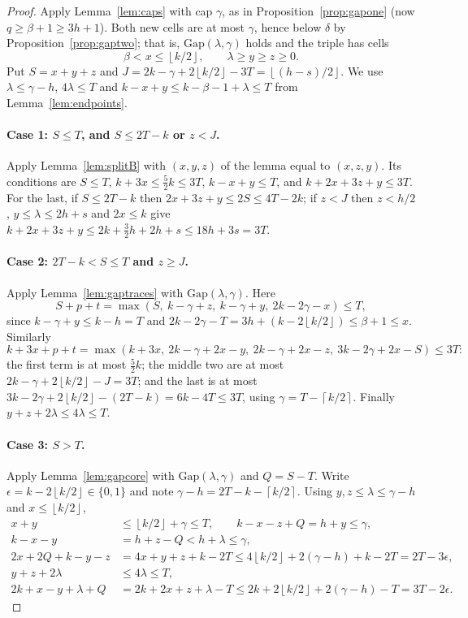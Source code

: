 \documentclass[11pt]{article}
\numberwithin{equation}{section}
\theoremstyle{definition}
\theoremstyle{remark}
\newcommand{\ceil}[1]{\left\lceil #1\right\rceil}
\newcommand{\floor}[1]{\left\lfloor #1\right\rfloor}
\newcommand{\Gap}{\mathrm{Gap}}
\begin{document}
\begin{proof}
Apply Lemma~\ref{lem:caps} with cap $\gamma$, as in
Proposition~\ref{prop:gapone} (now $q\ge\beta+1\ge3h+1$). Both new cells
are at most $\gamma$, hence below $\delta$ by
Proposition~\ref{prop:gaptwo}; that is, $\Gap(\lambda,\gamma)$ holds and
the triple has cells
\[
 \beta<x\le\floor{k/2},\qquad \lambda\ge y\ge z\ge0 .
\]
Put $S=x+y+z$ and $J=2k-\gamma+2\floor{k/2}-3T=\floor{(h-s)/2}$. We use
$\lambda\le\gamma-h$, $4\lambda\le T$ and $k-x+y\le k-\beta-1+\lambda\le T$
from Lemma~\ref{lem:endpoints}.

\paragraph{Case 1: $S\le T$, and $S\le2T-k$ or $z<J$.}
Apply Lemma~\ref{lem:splitB} with $(x,y,z)$ of the lemma equal to
$(x,z,y)$. Its conditions are $S\le T$, $k+3x\le\tfrac52k\le3T$,
$k-x+y\le T$, and $k+2x+3z+y\le3T$. For the last, if $S\le2T-k$ then
$2x+3z+y\le2S\le4T-2k$; if $z<J$ then $z<h/2$, $y\le\lambda\le2h+s$ and
$2x\le k$ give $k+2x+3z+y\le2k+\tfrac32h+2h+s\le18h+3s=3T$.

\paragraph{Case 2: $2T-k<S\le T$ and $z\ge J$.}
Apply Lemma~\ref{lem:gaptraces} with $\Gap(\lambda,\gamma)$. Here
\[
 S+p+t=\max(S,\ k-\gamma+z,\ k-\gamma+y,\ 2k-2\gamma-x)\le T,
\]
since $k-\gamma+y\le k-h=T$ and $2k-2\gamma-T=3h+(k-2\floor{k/2})\le\beta+1\le x$.
Similarly
\[
 k+3x+p+t=\max(k+3x,\ 2k-\gamma+2x-y,\ 2k-\gamma+2x-z,\ 3k-2\gamma+2x-S)\le3T:
\]
the first term is at most $\tfrac52k$; the middle two are at most
$2k-\gamma+2\floor{k/2}-J=3T$; and the last is at most
$3k-2\gamma+2\floor{k/2}-(2T-k)=6k-4T\le3T$, using
$\gamma=T-\ceil{k/2}$. Finally $y+z+2\lambda\le4\lambda\le T$.

\paragraph{Case 3: $S>T$.}
Apply Lemma~\ref{lem:gapcore} with $\Gap(\lambda,\gamma)$ and
$Q=S-T$. Write $\epsilon=k-2\floor{k/2}\in\{0,1\}$ and note
$\gamma-h=2T-k-\ceil{k/2}$. Using $y,z\le\lambda\le\gamma-h$ and
$x\le\floor{k/2}$,
\begin{align*}
 x+y&\le\floor{k/2}+\gamma\le T,\qquad k-x-z+Q=h+y\le\gamma,\\
 k-x-y&=h+z-Q<h+\lambda\le\gamma,\\
 2x+2Q+k-y-z&=4x+y+z+k-2T\le4\floor{k/2}+2(\gamma-h)+k-2T=2T-3\epsilon,\\
 y+z+2\lambda&\le4\lambda\le T,\\
 2k+x-y+\lambda+Q&=2k+2x+z+\lambda-T\le2k+2\floor{k/2}+2(\gamma-h)-T=3T-2\epsilon.
\end{align*}
\end{proof}
\end{document}
